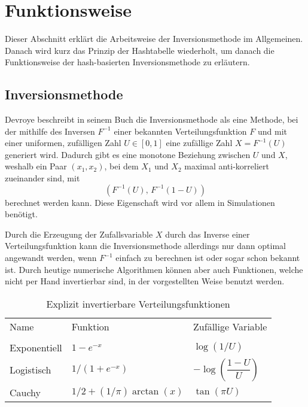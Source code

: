 \section{Funktionsweise}
\label{funktion}

Dieser Abschnitt erklärt die Arbeitsweise der Inversionsmethode im Allgemeinen. Danach wird kurz das Prinzip 
der Hashtabelle wiederholt, um danach die Funktionsweise der hash-basierten Inversionsmethode zu erläutern.


\subsection{Inversionsmethode}
Devroye \cite{devroye-non_uniform_random_variate-1986} beschreibt in seinem Buch die Inversionsmethode als eine 
Methode, bei der mithilfe des Inversen $F^{-1}$ einer bekannten Verteilungsfunktion $F$ und mit einer uniformen, 
zufälligen Zahl $U \in [0, 1]$ eine zufällige Zahl $X = F^{-1}(U)$ generiert wird. Dadurch gibt es eine monotone 
Beziehung zwischen $U$ und $X$, weshalb ein Paar $(x_1, x_2)$, bei dem $X_1$ und $X_2$ maximal anti-korreliert 
zueinander sind, mit 
\begin{equation}
    (F^{-1}(U),\, F^{-1}(1 - U))
\end{equation}
berechnet werden kann. Diese Eigenschaft wird vor allem in 
Simulationen benötigt.

Durch die Erzeugung der Zufallsvariable $X$ durch das Inverse einer Verteilungsfunktion kann die Inversionsmethode 
allerdings nur dann optimal angewandt werden, wenn $F^{-1}$ einfach zu berechnen ist oder sogar schon bekannt ist. 
Durch heutige numerische Algorithmen können aber auch Funktionen, welche nicht \glqq per Hand\grqq{} invertierbar sind, in der 
vorgestellten Weise benutzt werden. 

\begin{table}
    \centering
    \begin{tabular}{lll}
    Name         & Funktion & Zufällige Variable \\
                 &          &                    \\
    Exponentiell & $1 - e^{-x}$ & $\log(1/U)$ \\
    Logistisch   & $1 / (1 + e^{-x})$ & $-\log(\dfrac{1-U}{U})$ \\
    Cauchy       & $1/2 + (1/\pi) \arctan(x)$ & $\tan(\pi U)$
    \end{tabular}
    \caption{Explizit invertierbare Verteilungsfunktionen \cite{devroye-non_uniform_random_variate-1986}}
    \label{fig:invFuncs}
\end{table}

